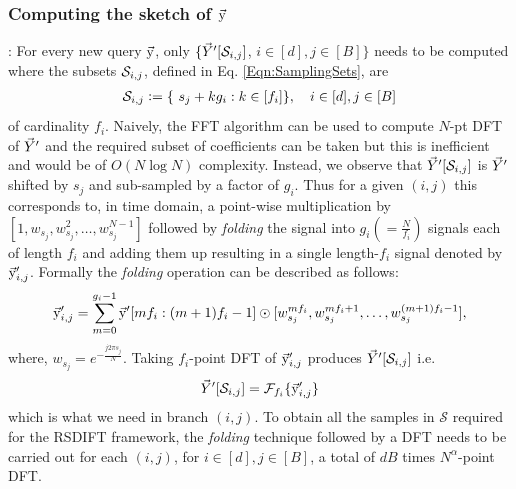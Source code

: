 \subsubsection*{Computing the sketch of $\vec{\mathrm{y}}$}: For every new query $\vec{\mathrm{y}}$, only $\{\vec{Y}'[\mathcal{S}_{i,j}]$,  $i\in[d],j\in[B]\}$ needs to be computed where the subsets $\mathcal{S}_{i,j}$, defined in Eq. \eqref{Eqn:SamplingSets}, are
\begin{align}
	 \mathcal{S}_{i,j} \mathrel{\mathop:}= \{\ s_j + k g_i: k\in[f_i]\}, \quad i\in[d], j\in[B]
\end{align}
of cardinality $f_i$. Naively, the FFT algorithm can be used to compute $N$-pt DFT of $\vec{Y}'$ and the required subset of coefficients can be taken but this is inefficient and would be of $O(N \log N)$ complexity. Instead, we observe that $\vec{Y}'[\mathcal{S}_{i,j}]$ is $\vec{Y}'$ shifted by $s_j$ and sub-sampled by a factor of $g_i$. Thus for a given $(i,j)$ this corresponds to, in time domain, a point-wise multiplication by $[1,w_{s_j},w_{s_j}^2,\ldots,w_{s_j}^{N-1}]$ followed by \textit{folding} the signal into $g_i(=\frac{N}{f_i})$ signals each of length $f_i$ and adding them up resulting in a single length-$f_i$ signal denoted by $\vec{\mathrm{y}}'_{i,j}$. Formally the \textit{folding} operation can be described as follows:
\begin{equation*}
	\vec{\mathrm{y}}'_{i,j} = \sum \limits_{m = 0}^{g_i-1} \vec{\mathrm{y}}'[mf_i:(m+1)f_i-1] \odot [w_{s_j}^{mf_i},w_{s_j}^{mf_i+1},\ldots, w_{s_j}^{(m+1)f_i-1}],
\end{equation*}	
where, $w_{s_j}=e^{-\frac{j2\pi s_j}{N}}$. Taking $f_i$-point DFT of $\vec{\mathrm{y}}'_{i,j}$ produces $\vec{Y}'[\mathcal{S}_{i,j}]$ i.e. 
 \begin{align*}
	\vec{Y}'[\mathcal{S}_{i,j}]=\mathcal{F}_{f_i} \{\vec{\mathrm{y}}'_{i,j}\}
\end{align*}
which is what we need in branch $(i,j)$. To obtain all the samples in $\mathcal{S}$ required for the RSDIFT framework, the \textit{folding} technique followed by a DFT needs to be carried out for each $(i,j)$, for $i\in[d],j\in[B]$, a total of $dB$ times $N^{\alpha}$-point DFT.

